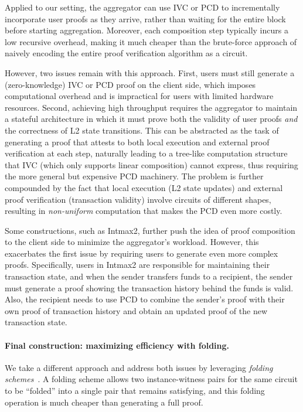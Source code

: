 Applied to our setting, the aggregator can use \ac{IVC} or \ac{PCD} to incrementally incorporate user proofs as they arrive, rather than waiting for the entire block before starting aggregation.
Moreover, each composition step typically incurs a low recursive overhead, making it much cheaper than the brute-force approach of naively encoding the entire proof verification algorithm as a circuit.

However, two issues remain with this approach.
First, users must still generate a (zero-knowledge) \ac{IVC} or \ac{PCD} proof on the client side, which imposes computational overhead and is impractical for users with limited hardware resources.
Second, achieving high throughput requires the aggregator to maintain a stateful architecture in which it must prove both the validity of user proofs \textit{and} the correctness of \ac{L2} state transitions.
This can be abstracted as the task of generating a proof that attests to both local execution and external proof verification at each step, naturally leading to a tree-like computation structure that \ac{IVC} (which only supports linear composition) cannot express, thus requiring the more general but expensive \ac{PCD} machinery.
The problem is further compounded by the fact that local execution (\ac{L2} state updates) and external proof verification (transaction validity) involve circuits of different shapes, resulting in \textit{non-uniform} computation that makes the \ac{PCD} even more costly.

Some constructions, such as Intmax2, further push the idea of proof composition to the client side to minimize the aggregator's workload. However, this exacerbates the first issue by requiring users to generate even more complex proofs.
Specifically, users in Intmax2 are responsible for maintaining their transaction state, and when the sender transfers funds to a recipient, the sender must generate a proof showing the transaction history behind the funds is valid.
Also, the recipient needs to use \ac{PCD} to combine the sender's proof with their own proof of transaction history and obtain an updated proof of the new transaction state.

\paragraph{Final construction: maximizing efficiency with folding.}

We take a different approach and address both issues by leveraging \textit{folding schemes}~\cite{C:KotSetTzi22}.
A folding scheme allows two instance-witness pairs for the same circuit to be ``folded'' into a single pair that remains satisfying, and this folding operation is much cheaper than generating a full proof.

